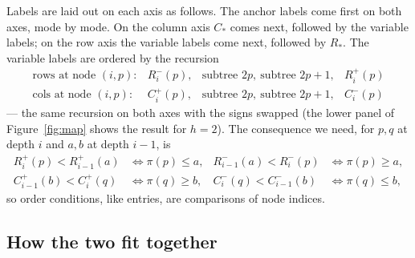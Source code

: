 \documentclass{article}
\theoremstyle{plain}
\theoremstyle{definition}
\begin{document}
Labels are laid out on each axis as follows. The anchor labels come first on
both axes, mode by mode. On the column axis $C_*$ comes next, followed by the
variable labels; on the row axis the variable labels come next, followed by
$R_*$. The variable labels are ordered by the recursion
\[
\begin{array}{llll}
\text{rows at node }(i,p): & R_i^-(p), & \text{subtree }2p,\ \text{subtree }2p{+}1, & R_i^+(p)\\[2pt]
\text{cols at node }(i,p): & C_i^+(p), & \text{subtree }2p,\ \text{subtree }2p{+}1, & C_i^-(p)
\end{array}
\]
--- the same recursion on both axes with the signs swapped (the lower panel of
Figure~\ref{fig:map} shows the result for $h=2$). The consequence we need, for
$p,q$ at depth $i$ and $a,b$ at depth $i-1$, is
\begin{equation}\label{eq:orders}
\begin{aligned}
  R_i^+(p)<R_{i-1}^+(a)&\iff\pi(p)\le a, &
  R_{i-1}^-(a)<R_i^-(p)&\iff\pi(p)\ge a,\\
  C_{i-1}^+(b)<C_i^+(q)&\iff\pi(q)\ge b, &
  C_i^-(q)<C_{i-1}^-(b)&\iff\pi(q)\le b,
\end{aligned}
\end{equation}
so order conditions, like entries, are comparisons of node indices.

\subsection*{How the two fit together}
\end{document}
